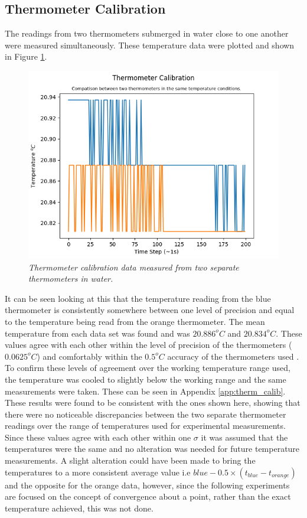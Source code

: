 \documentclass[10pt]{article}
\begin{document}
\subsection*{Thermometer Calibration}
The readings from two thermometers submerged in water close to one another were measured simultaneously. These temperature data were plotted and shown in Figure \ref{fig:therm_calib}.
\begin{figure}[h!]
    \centering
    \includegraphics[scale=0.75]{therm_calib.png}
    \caption{\it{Thermometer calibration data measured from two separate thermometers in water.}}
    \label{fig:therm_calib}
\end{figure}

It can be seen looking at this that the temperature reading from the blue thermometer is consistently somewhere between one level of precision and equal to the temperature being read from the orange thermometer. The mean temperature from each data set was found and was $20.886^oC$ and $20.834^oC$. These values agree with each other within the level of precision of the thermometers ($0.0625^oC$) and comfortably within the $0.5^oC$ accuracy of the thermometers used \cite{thermometer}. To confirm these levels of agreement over the working temperature range used, the temperature was cooled to slightly below the working range and the same measurements were taken. These can be seen in Appendix \ref{app:therm_calib}. These results were found to be consistent with the ones shown here, showing that there were no noticeable discrepancies between the two separate thermometer readings over the range of temperatures used for experimental measurements.
Since these values agree with each other within one $\sigma$ it was assumed that the temperatures were the same and no alteration was needed for future temperature measurements. A slight alteration could have been made to bring the temperatures to a more consistent average value i.e $blue - 0.5\times(t_{blue}-t_{orange})$ and the opposite for the orange data, however, since the following experiments are focused on the concept of convergence about a point, rather than the exact temperature achieved, this was not done.
\end{document}
